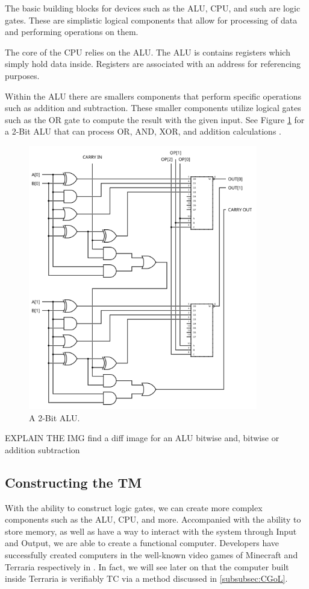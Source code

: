 The basic building blocks for devices such as the ALU, CPU, and such are logic gates.
These are simplistic logical components that allow for processing of data and performing operations on them.

The core of the CPU relies on the ALU.
The ALU is contains registers which simply hold data inside.
Registers are associated with an address for referencing purposes.

Within the ALU there are smallers components that perform specific operations such as addition and subtraction.
These smaller components utilize logical gates such as the OR gate to compute the result with the given input.
See Figure \ref{fig:2BitALU} for a 2-Bit ALU that can process OR, AND, XOR, and addition calculations \cite{ALUImg}.

\begin{figure}[htb]
    \centering
    \includegraphics[width=10cm]{Images/2-bit_ALU.svg.png}
       \caption{A 2-Bit ALU.}
           \label{fig:2BitALU}
\end{figure}

EXPLAIN THE IMG
find a diff image for an ALU
    bitwise and, bitwise or
    addition
    subtraction

\subsection{Constructing the TM}\label{subsec:CreateTM}

With the ability to construct logic gates, we can create more complex components such as the ALU, CPU, and more.
Accompanied with the ability to store memory, as well as have a way to interact with the system through Input and Output, we are able to create a functional computer.
Developers have successfully created computers in the well-known video games of Minecraft and Terraria respectively in \cite{MCTM,TerrariaTM,TerrariaTMGH}.
In fact, we will see later on that the computer built inside Terraria is verifiably TC via a method discussed in \ref{subsubsec:CGoL}.

